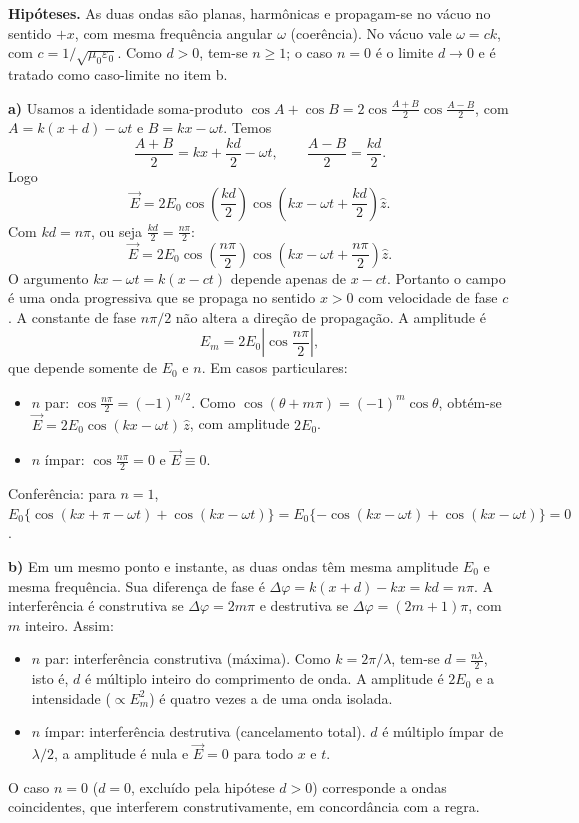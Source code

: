 \documentclass{article}%
\begin{document}
\textbf{Hipóteses.} As duas ondas são planas, harmônicas e propagam-se no vácuo no sentido $+x$, com mesma frequência angular $\omega$ (coerência). No vácuo vale $\omega = ck$, com $c = 1/\sqrt{\mu_0\varepsilon_0}$. Como $d>0$, tem-se $n\geq 1$; o caso $n=0$ é o limite $d\to 0$ e é tratado como caso-limite no item b.

\textbf{a)} Usamos a identidade soma-produto $\cos A+\cos B=2\cos\frac{A+B}{2}\cos\frac{A-B}{2}$, com $A=k(x+d)-\omega t$ e $B=kx-\omega t$. Temos
\[
\frac{A+B}{2}=kx+\frac{kd}{2}-\omega t, \qquad \frac{A-B}{2}=\frac{kd}{2}.
\]
Logo
\[
\vec{E}=2E_0\cos\left(\frac{kd}{2}\right)\cos\left(kx-\omega t+\frac{kd}{2}\right)\hat{z}.
\]
Com $kd=n\pi$, ou seja $\frac{kd}{2}=\frac{n\pi}{2}$:
\[
\vec{E}=2E_0\cos\left(\frac{n\pi}{2}\right)\cos\left(kx-\omega t+\frac{n\pi}{2}\right)\hat{z}.
\]
O argumento $kx-\omega t=k(x-ct)$ depende apenas de $x-ct$. Portanto o campo é uma onda progressiva que se propaga no sentido $x>0$ com velocidade de fase $c$. A constante de fase $n\pi/2$ não altera a direção de propagação. A amplitude é
\[
E_m=2E_0\left|\cos\frac{n\pi}{2}\right|,
\]
que depende somente de $E_0$ e $n$. Em casos particulares:
\begin{itemize}
\item $n$ par: $\cos\frac{n\pi}{2}=(-1)^{n/2}$. Como $\cos(\theta+m\pi)=(-1)^m\cos\theta$, obtém-se $\vec{E}=2E_0\cos(kx-\omega t)\,\hat{z}$, com amplitude $2E_0$.
\item $n$ ímpar: $\cos\frac{n\pi}{2}=0$ e $\vec{E}\equiv 0$.
\end{itemize}
Conferência: para $n=1$, $E_0\{\cos(kx+\pi-\omega t)+\cos(kx-\omega t)\}=E_0\{-\cos(kx-\omega t)+\cos(kx-\omega t)\}=0$.

\textbf{b)} Em um mesmo ponto e instante, as duas ondas têm mesma amplitude $E_0$ e mesma frequência. Sua diferença de fase é $\Delta\varphi=k(x+d)-kx=kd=n\pi$. A interferência é construtiva se $\Delta\varphi=2m\pi$ e destrutiva se $\Delta\varphi=(2m+1)\pi$, com $m$ inteiro. Assim:
\begin{itemize}
\item $n$ par: interferência construtiva (máxima). Como $k=2\pi/\lambda$, tem-se $d=\frac{n\lambda}{2}$, isto é, $d$ é múltiplo inteiro do comprimento de onda. A amplitude é $2E_0$ e a intensidade ($\propto E_m^2$) é quatro vezes a de uma onda isolada.
\item $n$ ímpar: interferência destrutiva (cancelamento total). $d$ é múltiplo ímpar de $\lambda/2$, a amplitude é nula e $\vec{E}=0$ para todo $x$ e $t$.
\end{itemize}
O caso $n=0$ ($d=0$, excluído pela hipótese $d>0$) corresponde a ondas coincidentes, que interferem construtivamente, em concordância com a regra.
\end{document}
